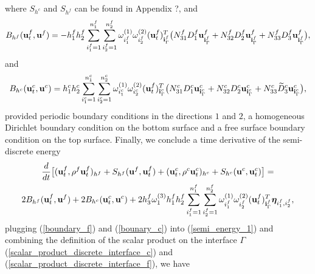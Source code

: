 \documentclass[a4paper]{article}
\newcommand{\wt}{\widetilde}
\begin{document}
where  $S_{h^c}$ and $S_{h^f}$ can be found in Appendix ?, and 
\begin{equation}\label{boundary_f}
B_{h^f} ({\bf u}_t^f,{\bf u}^f) = -h_1^fh_2^f\sum_{i_1^f = 1}^{n_1^f}\sum_{i_2^f=1}^{n_2^f}\omega_{i_1^f}^{(1)}\omega_{i_2^f}^{(2)}({\bf u}_t^f)^T_{{\bf i}^f_{\Gamma}}\big(N_{31}^fD_1^f {\bf u}^f_{{\bf i}^f_{\Gamma}}+ N_{32}^fD_2^f{\bf u}^f_{{\bf i}^f_{\Gamma}}+N_{33}^fD_3^f{\bf u}^f_{{\bf i}^f_{\Gamma}}\big),
\end{equation}
and
\begin{equation}\label{bounary_c}
B_{h^c} ({\bf u}_t^c,{\bf u}^c) = h_1^ch_2^c\sum_{i_1^c = 1}^{ n_1^c}\sum_{i_2^c=1}^{n_2^c}\omega_{i_1^c}^{(1)}\omega_{i_2^c}^{(2)}({\bf u}_t^f)^T_{{\bf i}^c_{\Gamma}}\big(N_{31}^cD_1^c {\bf u}^c_{{\bf i}^c_{\Gamma}}+ N_{32}^cD_2^c{\bf u}^c_{{\bf i}^c_{\Gamma}}+N_{33}^c\wt{D}_3^c{\bf u}^c_{{\bf i}^c_{\Gamma}}\big),
\end{equation}
provided periodic boundary conditions in the directions $1$ and $2$, a homogeneous Dirichlet boundary condition on the bottom surface and a free surface boundary condition on the top surface. Finally, we conclude a time derivative of the semi-discrete energy
\begin{multline}\label{semi_energy_1}
\frac{d}{dt}\big[({\bf u}_t^f,\rho^f {\bf u}_t^f)_{h^f} + S_{h^f}({\bf u}^f,{\bf u}^f_t) + ({\bf u}_t^c,\rho^c {\bf u}_t^c)_{h^c} + S_{h^c}({\bf u}^c,{\bf u}^c_t) \big]  = \\
2B_{h^f}({\bf u}_t^f,{\bf u}^f) + 2B_{h^c}({\bf u}_t^c,{\bf u}^c) + 2h_3^f\omega_1^{(3)}h_1^f h_2^f\sum_{i_1^f=1}^{n_1^f}\sum_{i_2^f=1}^{n_2^f}\omega_{i_1^f}^{(1)}\omega_{i_2^f}^{(2)}({\bf u}_t^f)^T_{{\bf i}^f_{\Gamma}}{\bm \eta}_{i_1^f,i_2^f},
\end{multline}
plugging (\ref{boundary_f}) and (\ref{bounary_c}) into (\ref{semi_energy_1}) and combining the definition of the scalar product on the interface $\Gamma$ (\ref{scalar_product_discrete_interface_c}) and (\ref{scalar_product_discrete_interface_f}), we have
\end{document}
